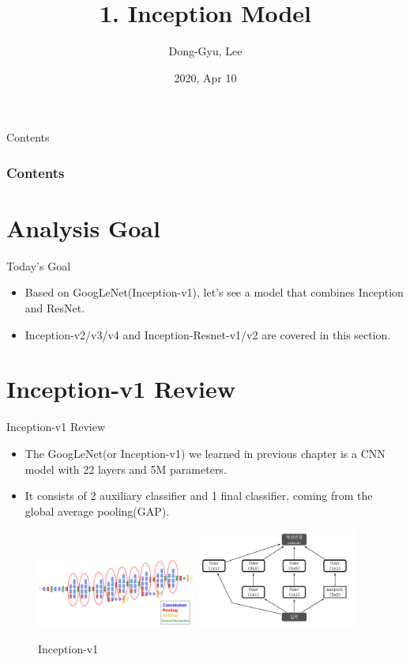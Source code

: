 \documentclass{beamer}
\title[Short title]{1. Inception Model }
\author{Dong-Gyu, Lee}
\institute[] %
{
	Dept. of Statistics, KU%
\medskip
}
\date{2020, Apr 10} %
\begin{document}
\begin{frame}
\titlepage %
\end{frame}

\begin{frame}{Contents}
\frametitle{Contents}
	\tableofcontents 
\end{frame}

\section{Analysis Goal}
\begin{frame}{Today's Goal}
	\begin{itemize}
		\item Based on GoogLeNet(Inception-v1), let's see a model that combines Inception and ResNet.
		\item Inception-v2/v3/v4 and Inception-Resnet-v1/v2 are covered in this section.
	\end{itemize}
\end{frame}


\section{Inception-v1 Review}
\begin{frame}{Inception-v1 Review}
	\begin{itemize}
		\item The GoogLeNet(or Inception-v1) we learned in previous chapter is a CNN model with 22 layers and 5M parameters.
		\item It consists of 2 auxiliary classifier and 1 final classifier, coming from the global average pooling(GAP).
	\end{itemize}
	\vspace{7pt}
	\begin{figure}[h]		
		\centering
		{\includegraphics[page={1},width=0.47\textwidth]{./etc/googlenet.PNG}}
		\quad
		{\includegraphics[page={2},width=0.47\textwidth]{./etc/inception_module.PNG}}
		\caption{Inception-v1}
		\label{v1}
	\end{figure}
\end{frame}
\end{document}
